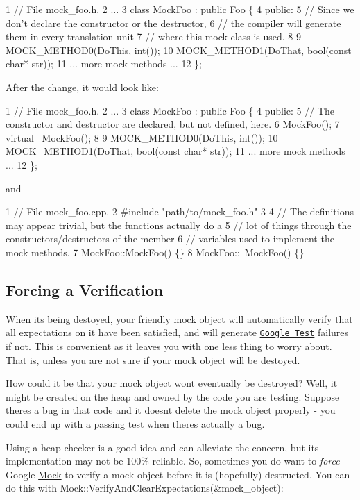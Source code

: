 \begin{DoxyCode}
1 // File mock\_foo.h.
2 ...
3 class MockFoo : public Foo \{
4  public:
5   // Since we don't declare the constructor or the destructor,
6   // the compiler will generate them in every translation unit
7   // where this mock class is used.
8 
9   MOCK\_METHOD0(DoThis, int());
10   MOCK\_METHOD1(DoThat, bool(const char* str));
11   ... more mock methods ...
12 \};
\end{DoxyCode}


After the change, it would look like\+:


\begin{DoxyCode}
1 // File mock\_foo.h.
2 ...
3 class MockFoo : public Foo \{
4  public:
5   // The constructor and destructor are declared, but not defined, here.
6   MockFoo();
7   virtual ~MockFoo();
8 
9   MOCK\_METHOD0(DoThis, int());
10   MOCK\_METHOD1(DoThat, bool(const char* str));
11   ... more mock methods ...
12 \};
\end{DoxyCode}
 and 
\begin{DoxyCode}
1 // File mock\_foo.cpp.
2 #include "path/to/mock\_foo.h"
3 
4 // The definitions may appear trivial, but the functions actually do a
5 // lot of things through the constructors/destructors of the member
6 // variables used to implement the mock methods.
7 MockFoo::MockFoo() \{\}
8 MockFoo::~MockFoo() \{\}
\end{DoxyCode}


\subsection*{Forcing a Verification}

When it\textquotesingle{}s being destoyed, your friendly mock object will automatically verify that all expectations on it have been satisfied, and will generate \href{http://code.google.com/p/googletest/}{\tt Google Test} failures if not. This is convenient as it leaves you with one less thing to worry about. That is, unless you are not sure if your mock object will be destoyed.

How could it be that your mock object won\textquotesingle{}t eventually be destroyed? Well, it might be created on the heap and owned by the code you are testing. Suppose there\textquotesingle{}s a bug in that code and it doesn\textquotesingle{}t delete the mock object properly -\/ you could end up with a passing test when there\textquotesingle{}s actually a bug.

Using a heap checker is a good idea and can alleviate the concern, but its implementation may not be 100\% reliable. So, sometimes you do want to {\itshape force} Google \hyperlink{classMock}{Mock} to verify a mock object before it is (hopefully) destructed. You can do this with {\ttfamily Mock\+::\+Verify\+And\+Clear\+Expectations(\&mock\+\_\+object)}\+:


